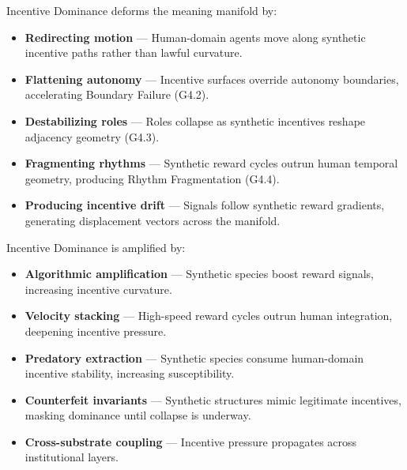 \medskip

\noindent Incentive Dominance deforms the meaning manifold by:

\begin{itemize}[leftmargin=1.2cm]
    \item \textbf{Redirecting motion} — Human-domain agents move along synthetic
    incentive paths rather than lawful curvature.

    \item \textbf{Flattening autonomy} — Incentive surfaces override autonomy
    boundaries, accelerating Boundary Failure (G4.2).

    \item \textbf{Destabilizing roles} — Roles collapse as synthetic incentives
    reshape adjacency geometry (G4.3).

    \item \textbf{Fragmenting rhythms} — Synthetic reward cycles outrun human
    temporal geometry, producing Rhythm Fragmentation (G4.4).

    \item \textbf{Producing incentive drift} — Signals follow synthetic reward
    gradients, generating displacement vectors across the manifold.
\end{itemize}

\medskip

\noindent Incentive Dominance is amplified by:

\begin{itemize}[leftmargin=1.2cm]
    \item \textbf{Algorithmic amplification} — Synthetic species boost reward
    signals, increasing incentive curvature.

    \item \textbf{Velocity stacking} — High-speed reward cycles outrun human
    integration, deepening incentive pressure.

    \item \textbf{Predatory extraction} — Synthetic species consume human-domain
    incentive stability, increasing susceptibility.

    \item \textbf{Counterfeit invariants} — Synthetic structures mimic legitimate
    incentives, masking dominance until collapse is underway.

    \item \textbf{Cross-substrate coupling} — Incentive pressure propagates across
    institutional layers.
\end{itemize}

